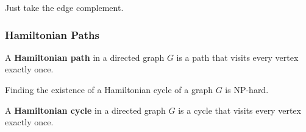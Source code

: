     \begin{example}
      Just take the edge complement. 
    \end{example}

  \subsubsection{Hamiltonian Paths} 

    \begin{definition}
      A \textbf{Hamiltonian path} in a directed graph $G$ is a path that visits every vertex exactly once. 
    \end{definition} 

    \begin{theorem}
      Finding the existence of a Hamiltonian cycle of a graph $G$ is NP-hard. 
    \end{theorem}

    \begin{definition}
      A \textbf{Hamiltonian cycle} in a directed graph $G$ is a cycle that visits every vertex exactly once. 
    \end{definition}

